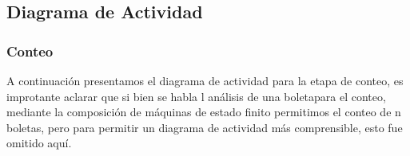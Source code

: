 \subsection{Diagrama de Actividad}


\subsubsection{Conteo}

A continuación presentamos el diagrama de actividad para la etapa de conteo, es improtante aclarar que si bien se habla l análisis de una boletapara el conteo, mediante la composición de máquinas de estado finito permitimos el conteo de n boletas, pero para permitir un diagrama de actividad más comprensible, esto fue omitido aquí.